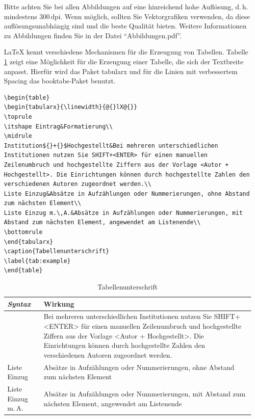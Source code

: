 \documentclass[ngerman]{mucproc}
\newenvironment{minted}[2][]{\endgraf\verbatim}{\endverbatim}
\begin{document}
Bitte achten Sie bei allen Abbildungen auf eine hinreichend hohe Auflösung, d.\,h. mindestens 300\,dpi. Wenn möglich, sollten Sie Vektorgrafiken verwenden, da diese auflösungsunabhängig sind und die beste Qualität bieten. Weitere Informationen zu Abbildungen finden Sie in der Datei \enquote{Abbildungen.pdf}.

\LaTeX{} kennt verschiedene Mechanismen für die Erzeugung von Tabellen. Tabelle \ref{tab:example} zeigt eine Möglichkeit für die Erzeugung einer Tabelle, die sich der Textbreite anpasst. Hierfür wird das Paket \textsf{tabularx} und für die Linien mit verbessertem Spacing das \textsf{booktabs}-Paket benutzt.

\begin{verbatim}
\begin{table}
\begin{tabularx}{\linewidth}{@{}lX@{}}
\toprule
\itshape Eintrag&Formatierung\\
\midrule
Institution${}+{}$Hochgestellt&Bei mehreren unterschiedlichen Institutionen nutzen Sie SHIFT+<ENTER> für einen manuellen Zeilenumbruch und hochgestellte Ziffern aus der Vorlage <Autor + Hochgestellt>. Die Einrichtungen können durch hochgestellte Zahlen den verschiedenen Autoren zugeordnet werden.\\
Liste Einzug&Absätze in Aufzählungen oder Nummerierungen, ohne Abstand zum nächsten Element\\
Liste Einzug m.\,A.&Absätze in Aufzählungen oder Nummerierungen, mit Abstand zum nächsten Element, angewendet am Listenende\\
\bottomrule
\end{tabularx}
\caption{Tabellenunterschrift}
\label{tab:example}
\end{table}
\end{verbatim}

\begin{table}%
	\begin{tabularx}{\linewidth}{@{}lX@{}}
		\toprule
		\itshape Syntax&Wirkung\\
		\midrule
		&Bei mehreren unterschiedlichen Institutionen nutzen Sie SHIFT+<ENTER> für einen manuellen Zeilenumbruch und hochgestellte Ziffern aus der Vorlage <Autor + Hochgestellt>. Die Einrichtungen können durch hochgestellte Zahlen den verschiedenen Autoren zugeordnet werden.\\
		Liste Einzug&Absätze in Aufzählungen oder Nummerierungen, ohne Abstand zum nächsten Element\\
		Liste Einzug m.\,A.&Absätze in Aufzählungen oder Nummerierungen, mit Abstand zum nächsten Element, angewendet am Listenende\\
		\bottomrule
	\end{tabularx}
	\caption{Tabellenunterschrift}
	\label{tab:example}
\end{table}
\end{document}

